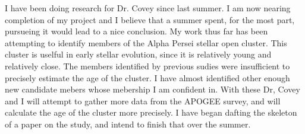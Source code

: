 \documentclass{article}
\begin{document}
I have been doing research for Dr. Covey since last summer.
  I am now nearing completion of my project and I believe that a summer spent, for the most part, pursueing it would lead to a nice conclusion.
  My work thus far has been  attempting to identify members of the Alpha Persei stellar open cluster.
  This cluster is uselful in early stellar evolution, since it is relatively young and relatively close.
 The members identified by previous sudies were insufficient to precisely estimate the age of the cluster.
  I have almost identified other enough new candidate mebers whose mebership I am confident in.
  With these Dr, Covey and I will attempt to gather more data from the APOGEE survey, and will calculate the age of the cluster more precisely.
  I have began dafting the skeleton of a paper on the study, and intend to finish that over the summer.  
\end{document}

